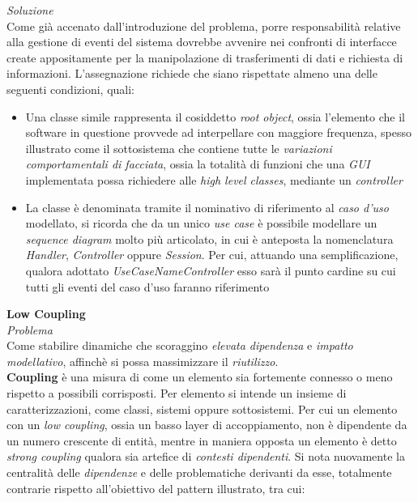 \documentclass{article}
\begin{document}
\textit{Soluzione}\\
Come già accenato dall'introduzione del problema, porre responsabilità relative alla gestione di eventi del sistema dovrebbe avvenire nei confronti di interfacce create appositamente per la manipolazione di trasferimenti di dati e richiesta di informazioni. L'assegnazione richiede che siano rispettate almeno una delle seguenti condizioni, quali:
\begin{itemize}[label={-}]
    \itemsep0em
    \item Una classe simile rappresenta il cosiddetto \textit{root object}, ossia l'elemento che il software in questione provvede ad interpellare con maggiore frequenza, spesso illustrato come il sottosistema che contiene tutte le \textit{variazioni comportamentali di facciata}, ossia la totalità di funzioni che una \textit{GUI} implementata possa richiedere alle \textit{high level classes}, mediante un \textit{controller}
    \item La classe è denominata tramite il nominativo di riferimento al \textit{caso d'uso} modellato, si ricorda che da un unico \textit{use case} è possibile modellare un \textit{sequence diagram} molto più articolato, in cui è anteposta la nomenclatura \textit{Handler}, \textit{Controller} oppure \textit{Session}. Per cui, attuando una semplificazione, qualora adottato \textit{UseCaseNameController} esso sarà il punto cardine su cui tutti gli eventi del caso d'uso faranno riferimento
\end{itemize}\vspace*{7pt}
\textbf{Low Coupling}\vspace*{7pt}\\
\textit{Problema}\\
Come stabilire dinamiche che scoraggino \textit{elevata dipendenza} e \textit{impatto modellativo}, affinchè si possa massimizzare il \textit{riutilizzo}.\vspace*{7pt}\\
\textbf{Coupling} è una misura di come un elemento sia fortemente connesso o meno rispetto a possibili corrisposti. Per elemento si intende un insieme di caratterizzazioni, come classi, sistemi oppure sottosistemi. Per cui un elemento con un \textit{low coupling}, ossia un basso layer di accoppiamento, non è dipendente da un numero crescente di entità, mentre in maniera opposta un elemento è detto \textit{strong coupling} qualora sia artefice di \textit{contesti dipendenti}. Si nota nuovamente la centralità delle \textit{dipendenze} e delle problematiche derivanti da esse, totalmente contrarie rispetto all'obiettivo del pattern illustrato, tra cui:
\end{document}
